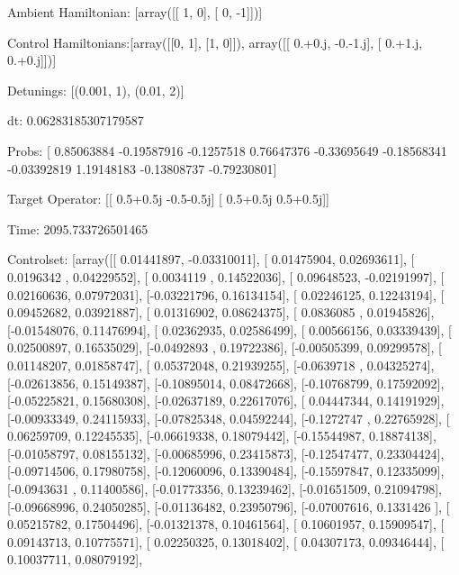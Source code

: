 \documentclass{article}
\begin{document}
    

\newpage

Ambient Hamiltonian: [array([[ 1,  0],
       [ 0, -1]])]

Control Hamiltonians:[array([[0, 1],
       [1, 0]]), array([[ 0.+0.j, -0.-1.j],
       [ 0.+1.j,  0.+0.j]])]

Detunings: [(0.001, 1), (0.01, 2)]

 dt: 0.06283185307179587

Probs: [ 0.85063884 -0.19587916 -0.1257518   0.76647376 -0.33695649 -0.18568341
 -0.03392819  1.19148183 -0.13808737 -0.79230801]

Target Operator: [[ 0.5+0.5j -0.5-0.5j]
 [ 0.5+0.5j  0.5+0.5j]]

Time: 2095.733726501465

Controlset: [array([[ 0.01441897, -0.03310011],
       [ 0.01475904,  0.02693611],
       [ 0.0196342 ,  0.04229552],
       [ 0.0034119 ,  0.14522036],
       [ 0.09648523, -0.02191997],
       [ 0.02160636,  0.07972031],
       [-0.03221796,  0.16134154],
       [ 0.02246125,  0.12243194],
       [ 0.09452682,  0.03921887],
       [ 0.01316902,  0.08624375],
       [ 0.0836085 ,  0.01945826],
       [-0.01548076,  0.11476994],
       [ 0.02362935,  0.02586499],
       [ 0.00566156,  0.03339439],
       [ 0.02500897,  0.16535029],
       [-0.0492893 ,  0.19722386],
       [-0.00505399,  0.09299578],
       [ 0.01148207,  0.01858747],
       [ 0.05372048,  0.21939255],
       [-0.0639718 ,  0.04325274],
       [-0.02613856,  0.15149387],
       [-0.10895014,  0.08472668],
       [-0.10768799,  0.17592092],
       [-0.05225821,  0.15680308],
       [-0.02637189,  0.22617076],
       [ 0.04447344,  0.14191929],
       [-0.00933349,  0.24115933],
       [-0.07825348,  0.04592244],
       [-0.1272747 ,  0.22765928],
       [ 0.06259709,  0.12245535],
       [-0.06619338,  0.18079442],
       [-0.15544987,  0.18874138],
       [-0.01058797,  0.08155132],
       [-0.00685996,  0.23415873],
       [-0.12547477,  0.23304424],
       [-0.09714506,  0.17980758],
       [-0.12060096,  0.13390484],
       [-0.15597847,  0.12335099],
       [-0.0943631 ,  0.11400586],
       [-0.01773356,  0.13239462],
       [-0.01651509,  0.21094798],
       [-0.09668996,  0.24050285],
       [-0.01136482,  0.23950796],
       [-0.07007616,  0.1331426 ],
       [ 0.05215782,  0.17504496],
       [-0.01321378,  0.10461564],
       [ 0.10601957,  0.15909547],
       [ 0.09143713,  0.10775571],
       [ 0.02250325,  0.13018402],
       [ 0.04307173,  0.09346444],
       [ 0.10037711,  0.08079192],
\end{document}
